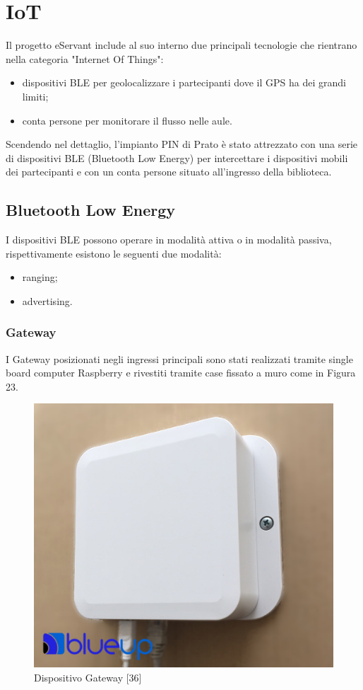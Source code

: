 \chapter{IoT}
Il progetto eServant include al suo interno due principali tecnologie che rientrano nella categoria
"Internet Of Things":
\begin{itemize}
    \item dispositivi BLE per geolocalizzare i partecipanti dove il GPS ha dei grandi limiti;
    \item conta persone per monitorare il flusso nelle aule.
\end{itemize}


Scendendo nel dettaglio, l'impianto PIN di Prato è stato attrezzato con una serie di dispositivi BLE 
(Bluetooth Low Energy) per intercettare i dispositivi mobili dei partecipanti e con un conta persone
situato all'ingresso della biblioteca.

\section{Bluetooth Low Energy}
I dispositivi BLE possono operare in modalità attiva o in modalità passiva, rispettivamente esistono
le seguenti due modalità:
\begin{itemize}
    \item ranging;
    \item advertising.
\end{itemize}


\subsection{Gateway}
I Gateway posizionati negli ingressi principali sono stati realizzati tramite single board computer 
Raspberry e rivestiti tramite case fissato a muro come in Figura 23.
\begin{figure}[H]
    \caption{Dispositivo Gateway [36]}
    \centering  
    \includegraphics[scale=0.4]{img/cap4/gateway}
\end{figure}

